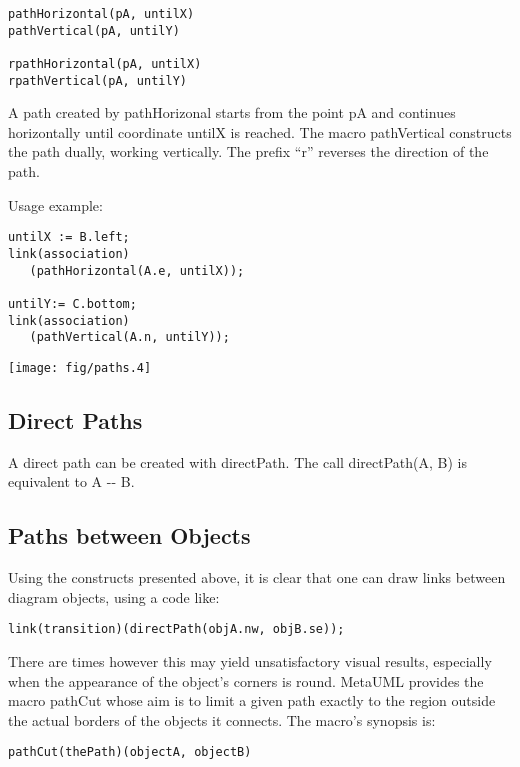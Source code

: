 \documentclass{article}
\newcommand{\code}{\ttfamily}
\begin{document}
\begin{verbatim}
pathHorizontal(pA, untilX)
pathVertical(pA, untilY)

rpathHorizontal(pA, untilX)
rpathVertical(pA, untilY)
\end{verbatim}

A path created by {\code pathHorizonal} starts from the point {\code pA}
and continues horizontally until coordinate {\code untilX} is reached. The macro
{\code pathVertical} constructs the path dually, working vertically.
The prefix ``{\code r}'' reverses the direction of the path.

Usage example:

\begin{multicols}{2}
\begin{verbatim}
untilX := B.left;
link(association)
   (pathHorizontal(A.e, untilX));

untilY:= C.bottom;
link(association)
   (pathVertical(A.n, untilY));
\end{verbatim}
\columnbreak
\hspace{1cm}\texttt{[image: fig/paths.4]}
\end{multicols}

\subsection{Direct Paths}

A direct path can be created with {\code directPath}. The call {\code directPath(A, B)}
is equivalent to {\code A -{}-  B}.

\subsection{Paths between Objects}

Using the constructs presented above, it is clear that one can draw links between diagram
objects, using a code like:

\begin{verbatim}
link(transition)(directPath(objA.nw, objB.se));
\end{verbatim}

There are times however this may yield unsatisfactory visual results,
especially when the appearance of the object's corners is round. MetaUML provides the macro
{\code pathCut} whose aim is to limit a given path exactly to the region outside the actual
borders of the objects it connects. The macro's synopsis is:

\begin{verbatim}
pathCut(thePath)(objectA, objectB)
\end{verbatim}
\end{document}
